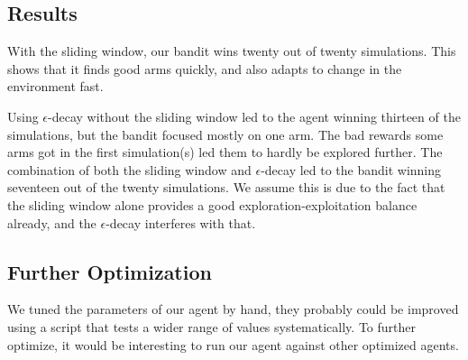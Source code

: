 \documentclass[10pt]{article}
\begin{document}
\subsection{Results}\label{subsec:mab-results}
With the sliding window, our bandit wins twenty out of twenty simulations.
This shows that it finds good arms quickly, and also adapts to change in the environment fast.

Using $\epsilon$-decay without the sliding window led to the agent winning thirteen of the simulations, but the bandit focused mostly on one arm.
The bad rewards some arms got in the first simulation(s) led them to hardly be explored further.
The combination of both the sliding window and $\epsilon$-decay led to the bandit winning seventeen out of the twenty simulations.
We assume this is due to the fact that the sliding window alone provides a good exploration-exploitation balance already, and the $\epsilon$-decay interferes with that.


\subsection{Further Optimization}\label{subsec:mab-further-optimization}
We tuned the parameters of our agent by hand, they probably could be improved using a script that tests a wider range of values systematically.
To further optimize, it would be interesting to run our agent against other optimized agents.
\end{document}
